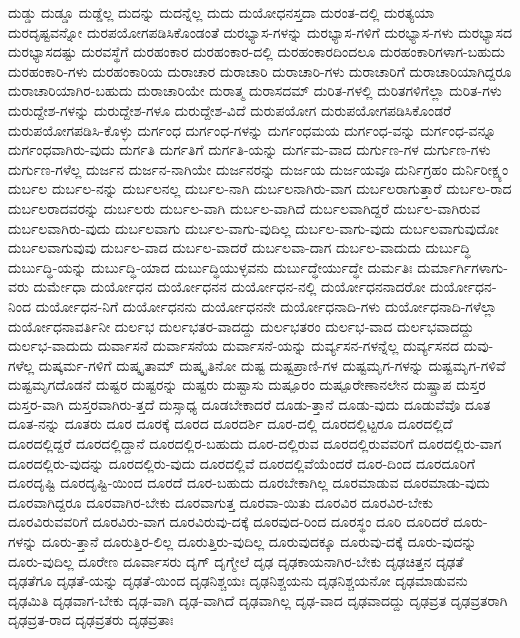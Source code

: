 {ದುಡ್ಡು
ದುಡ್ಡೂ
ದುಡ್ಡೆಲ್ಲ
ದುದನ್ನು
ದುದನ್ನೆಲ್ಲ
ದುದು
ದುಯೋಧನಸ್ತದಾ
ದುರಂತ-ದಲ್ಲಿ
ದುರತ್ಯಯಾ
ದುರದೃಷ್ಟವನ್ನೋ
ದುರಪಯೋಗಪಡಿಸಿಕೊಂಡಂತೆ
ದುರಭ್ಯಾಸ-ಗಳನ್ನು
ದುರಭ್ಯಾಸ-ಗಳಿಗೆ
ದುರಭ್ಯಾಸ-ಗಳು
ದುರಭ್ಯಾಸದ
ದುರಭ್ಯಾಸದಷ್ಟು
ದುರವಸ್ಥೆಗೆ
ದುರಹಂಕಾರ
ದುರಹಂಕಾರ-ದಲ್ಲಿ
ದುರಹಂಕಾರದಿಂದಲೂ
ದುರಹಂಕಾರಿಗಳಾಗ-ಬಹುದು
ದುರಹಂಕಾರಿ-ಗಳು
ದುರಹಂಕಾರಿಯ
ದುರಾಚಾರ
ದುರಾಚಾರಿ
ದುರಾಚಾರಿ-ಗಳು
ದುರಾಚಾರಿಗೆ
ದುರಾಚಾರಿಯಾಗಿದ್ದರೂ
ದುರಾಚಾರಿಯಾಗಿರ-ಬಹುದು
ದುರಾಚಾರಿಯೇ
ದುರಾತ್ಮ
ದುರಾಸದಮ್
ದುರಿತ-ಗಳಲ್ಲಿ
ದುರಿತಗಳಿಗೆಲ್ಲಾ
ದುರಿತ-ಗಳು
ದುರುದ್ದೇಶ-ಗಳನ್ನು
ದುರುದ್ದೇಶ-ಗಳೂ
ದುರುದ್ದೇಶ-ವಿದೆ
ದುರುಪಯೋಗ
ದುರುಪಯೋಗಪಡಿಸಿಕೊಂಡರೆ
ದುರುಪಯೋಗಪಡಿಸಿ-ಕೊಳ್ಳು
ದುರ್ಗಂಧ
ದುರ್ಗಂಧ-ಗಳನ್ನು
ದುರ್ಗಂಧಮಯ
ದುರ್ಗಂಧ-ವನ್ನು
ದುರ್ಗಂಧ-ವನ್ನೂ
ದುರ್ಗಂಧವಾಗಿರು-ವುದು
ದುರ್ಗತಿ
ದುರ್ಗತಿಗೆ
ದುರ್ಗತಿ-ಯನ್ನು
ದುರ್ಗಮ-ವಾದ
ದುರ್ಗುಣ-ಗಳ
ದುರ್ಗುಣ-ಗಳು
ದುರ್ಗುಣ-ಗಳೆಲ್ಲ
ದುರ್ಜನ
ದುರ್ಜನ-ನಾಗಿಯೇ
ದುರ್ಜನರನ್ನು
ದುರ್ಜಯ
ದುರ್ಜಯವೂ
ದುರ್ನಿಗ್ರಹಂ
ದುರ್ನಿರೀಕ್ಷ್ಯಂ
ದುರ್ಬಲ
ದುರ್ಬಲ-ನನ್ನು
ದುರ್ಬಲನಲ್ಲ
ದುರ್ಬಲ-ನಾಗಿ
ದುರ್ಬಲನಾಗಿರು-ವಾಗ
ದುರ್ಬಲರಾಗುತ್ತಾರೆ
ದುರ್ಬಲ-ರಾದ
ದುರ್ಬಲರಾದವರನ್ನು
ದುರ್ಬಲರು
ದುರ್ಬಲ-ವಾಗಿ
ದುರ್ಬಲ-ವಾಗಿದೆ
ದುರ್ಬಲವಾಗಿದ್ದರೆ
ದುರ್ಬಲ-ವಾಗಿರುವ
ದುರ್ಬಲವಾಗಿರು-ವುದು
ದುರ್ಬಲವಾಗು
ದುರ್ಬಲ-ವಾಗು-ವುದಿಲ್ಲ
ದುರ್ಬಲ-ವಾಗು-ವುದು
ದುರ್ಬಲವಾಗುವುದೋ
ದುರ್ಬಲವಾಗುವುವು
ದುರ್ಬಲ-ವಾದ
ದುರ್ಬಲ-ವಾದರೆ
ದುರ್ಬಲವಾ-ದಾಗ
ದುರ್ಬಲ-ವಾದುದು
ದುರ್ಬುದ್ಧಿ
ದುರ್ಬುದ್ಧಿ-ಯನ್ನು
ದುರ್ಬುದ್ಧಿ-ಯಾದ
ದುರ್ಬುದ್ಧಿಯುಳ್ಳವನು
ದುರ್ಬುದ್ಧೇರ್ಯುದ್ಧೇ
ದುರ್ಮತಿಃ
ದುರ್ಮಾರ್ಗಿಗಳಾಗು-ವರು
ದುರ್ಮೇಧಾ
ದುರ್ಯೋಧನ
ದುರ್ಯೋಧನನ
ದುರ್ಯೋಧನ-ನಲ್ಲಿ
ದುರ್ಯೋಧನನಾದರೋ
ದುರ್ಯೋಧನ-ನಿಂದ
ದುರ್ಯೋಧನ-ನಿಗೆ
ದುರ್ಯೋಧನನು
ದುರ್ಯೋಧನನೇ
ದುರ್ಯೋಧನಾದಿ-ಗಳು
ದುರ್ಯೋಧನಾದಿ-ಗಳೆಲ್ಲಾ
ದುರ್ಯೋಧನಾವರ್ತಿನೀ
ದುರ್ಲಭ
ದುರ್ಲಭತರ-ವಾದದ್ದು
ದುರ್ಲಭತರಂ
ದುರ್ಲಭ-ವಾದ
ದುರ್ಲಭವಾದದ್ದು
ದುರ್ಲಭ-ವಾದುದು
ದುರ್ವಾಸನೆ
ದುರ್ವಾಸನೆಯ
ದುರ್ವಾಸನೆ-ಯನ್ನು
ದುರ್ವ್ಯಸನ-ಗಳನ್ನೆಲ್ಲ
ದುರ್ವ್ಯಸನದ
ದುವು-ಗಳೆಲ್ಲ
ದುಷ್ಕರ್ಮ-ಗಳಿಗೆ
ದುಷ್ಕೃತಾಮ್
ದುಷ್ಕೃತಿನೋ
ದುಷ್ಟ
ದುಷ್ಟಪ್ರಾಣಿ-ಗಳ
ದುಷ್ಟಮೃಗ-ಗಳನ್ನು
ದುಷ್ಟಮೃಗ-ಗಳಿವೆ
ದುಷ್ಟಮೃಗದೊಡನೆ
ದುಷ್ಟರ
ದುಷ್ಟರನ್ನು
ದುಷ್ಟರು
ದುಷ್ಟಾಸು
ದುಷ್ಪೂರಂ
ದುಷ್ಪೂರೇಣಾನಲೇನ
ದುಷ್ಪ್ರಾಪ
ದುಸ್ತರ
ದುಸ್ತರ-ವಾಗಿ
ದುಸ್ತರವಾಗಿರು-ತ್ತದೆ
ದುಸ್ಸಾಧ್ಯ
ದೂಡಬೇಕಾದರೆ
ದೂಡು-ತ್ತಾನೆ
ದೂಡು-ವುದು
ದೂಡುವೆವೊ
ದೂತ
ದೂತ-ನನ್ನು
ದೂತರು
ದೂರ
ದೂರಕ್ಕೆ
ದೂರದ
ದೂರದರ್ಶಿ
ದೂರ-ದಲ್ಲಿ
ದೂರದಲ್ಲಿಟ್ಟರೂ
ದೂರದಲ್ಲಿದೆ
ದೂರದಲ್ಲಿದ್ದರೆ
ದೂರದಲ್ಲಿದ್ದಾನೆ
ದೂರದಲ್ಲಿರ-ಬಹುದು
ದೂರ-ದಲ್ಲಿರುವ
ದೂರದಲ್ಲಿರುವವರಿಗೆ
ದೂರದಲ್ಲಿರು-ವಾಗ
ದೂರದಲ್ಲಿರು-ವುದನ್ನು
ದೂರದಲ್ಲಿರು-ವುದು
ದೂರದಲ್ಲಿವೆ
ದೂರದಲ್ಲಿವೆಯೆಂದರೆ
ದೂರ-ದಿಂದ
ದೂರದೂರಿಗೆ
ದೂರದೃಷ್ಟಿ
ದೂರದೃಷ್ಟಿ-ಯಿಂದ
ದೂರದೆ
ದೂರ-ಬಹುದು
ದೂರಬೇಕಾಗಿಲ್ಲ
ದೂರಮಾಡುವ
ದೂರಮಾಡು-ವುದು
ದೂರವಾಗಿದ್ದರೂ
ದೂರವಾಗಿರ-ಬೇಕು
ದೂರವಾಗುತ್ತ
ದೂರವಾ-ಯಿತು
ದೂರವಿರ
ದೂರವಿರ-ಬೇಕು
ದೂರವಿರುವವರಿಗೆ
ದೂರವಿರು-ವಾಗ
ದೂರವಿರುವು-ದಕ್ಕೆ
ದೂರವುದ-ರಿಂದ
ದೂರಸ್ಥಂ
ದೂರಿ
ದೂರಿದರೆ
ದೂರು-ಗಳನ್ನು
ದೂರು-ತ್ತಾನೆ
ದೂರುತ್ತಿರ-ಲಿಲ್ಲ
ದೂರುತ್ತಿರು-ವುದಿಲ್ಲ
ದೂರುವುದಕ್ಕೂ
ದೂರುವು-ದಕ್ಕೆ
ದೂರು-ವುದನ್ನು
ದೂರು-ವುದಿಲ್ಲ
ದೂರೇಣ
ದೂರ್ವಾಸರು
ದೃಗ್
ದೃಗ್ಮೇಲೆ
ದೃಢ
ದೃಢಕಾಯನಾಗಿರ-ಬೇಕು
ದೃಢಚಿತ್ತನ
ದೃಢತೆ
ದೃಢತೆಗೂ
ದೃಢತೆ-ಯನ್ನು
ದೃಢತೆ-ಯಿಂದ
ದೃಢನಿಶ್ಚಯಃ
ದೃಢನಿಶ್ಚಯನು
ದೃಢನಿಶ್ಚಯನೋ
ದೃಢಮಾಡುವನು
ದೃಢಮಿತಿ
ದೃಢವಾಗ-ಬೇಕು
ದೃಢ-ವಾಗಿ
ದೃಢ-ವಾಗಿದೆ
ದೃಢವಾಗಿಲ್ಲ
ದೃಢ-ವಾದ
ದೃಢವಾದದ್ದು
ದೃಢವ್ರತ
ದೃಢವ್ರತರಾಗಿ
ದೃಢವ್ರತ-ರಾದ
ದೃಢವ್ರತರು
ದೃಢವ್ರತಾಃ
}
